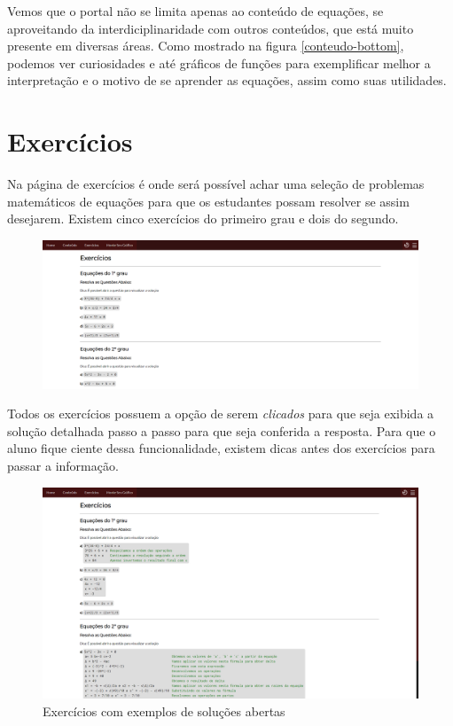 \documentclass[12pt]{report}
\begin{document}
Vemos que o portal não se limita apenas ao conteúdo de equações, se aproveitando da interdiciplinaridade com outros conteúdos, que está muito presente em diversas áreas. Como mostrado na figura \ref{conteudo-bottom}, podemos ver curiosidades e até gráficos de funções para exemplificar melhor a interpretação e o motivo de se aprender as equações, assim como suas utilidades.

\section{Exercícios}
Na página de exercícios é onde será possível achar uma seleção de problemas matemáticos de equações para que os estudantes possam resolver se assim desejarem. Existem cinco exercícios do primeiro grau e dois do segundo.

\begin{figure}[H]
    \includegraphics[width=1\textwidth]{img/aplicacao/exercicios.png}
\end{figure}

Todos os exercícios possuem a opção de serem \textit{clicados} para que seja exibida a solução detalhada passo a passo para que seja conferida a resposta. Para que o aluno fique ciente dessa funcionalidade, existem dicas antes dos exercícios para passar a informação.

\begin{figure}[H]
    \includegraphics[width=1\textwidth]{img/aplicacao/exercicios_abertos.png}
    \caption{Exercícios com exemplos de soluções abertas}
\end{figure}
\end{document}
